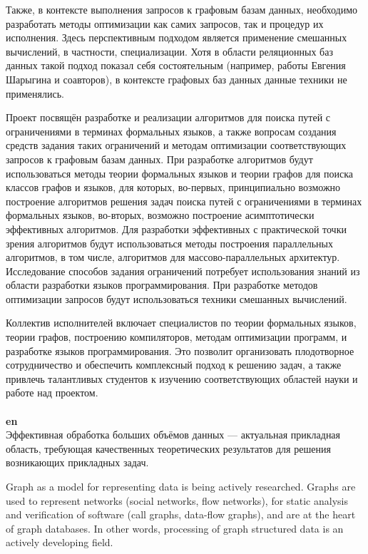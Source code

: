 \documentclass[12pt]{article}  %
\theoremstyle{remark}
\begin{document}
Также, в контексте выполнения запросов к графовым базам данных, необходимо разработать методы оптимизации как самих запросов, так и процедур их исполнения.
Здесь перспективным подходом является применение смешанных вычислений, в частности, специализации.
Хотя в области реляционных баз данных такой подход показал себя состоятельным (например, работы Евгения Шарыгина и соавторов), в контексте графовых баз данных данные техники не применялись.

Проект посвящён разработке и реализации алгоритмов для поиска путей с ограничениями в терминах формальных языков, а также вопросам создания средств задания таких ограничений и методам оптимизации соответствующих запросов к графовым базам данных.
При разработке алгоритмов будут использоваться методы теории формальных языков и теории графов для поиска классов графов и языков, для которых, во-первых, принципиально возможно построение алгоритмов решения задач поиска путей с ограничениями в терминах формальных языков, во-вторых,  возможно построение асимптотически эффективных алгоритмов.
Для разработки эффективных с практической точки зрения алгоритмов будут использоваться методы построения параллельных алгоритмов, в том числе, алгоритмов для массово-параллельных архитектур.
Исследование способов задания ограничений потребует использования знаний из области разработки языков программирования.
При разработке методов оптимизации запросов будут использоваться техники смешанных вычислений.

Коллектив исполнителей включает специалистов по теории формальных языков, теории графов, построению компиляторов, методам оптимизации программ, и разработке языков программирования.
Это позволит организовать плодотворное сотрудничество и обеспечить комплексный подход к решению задач, а также привлечь талантливых студентов к изучению соответствующих областей науки и работе над проектом.
\\
\\
\textbf{en}\\

Эффективная обработка больших объёмов данных --- актуальная прикладная область, требующая качественных теоретических результатов для решения возникающих прикладных задач.

Graph as a model for representing data is being actively researched.
Graphs are used to represent networks (social networks, flow networks), for static analysis and verification of software (call graphs, data-flow graphs), and are at the heart of graph databases.
In other words, processing of graph structured data is an actively developing field.
\end{document}
